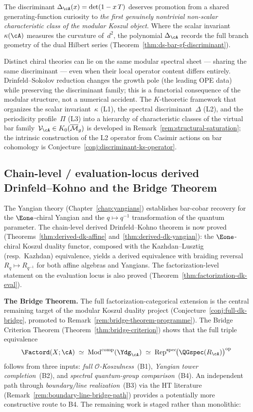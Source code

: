 The discriminant $\Delta_{\cA}(x) = \det(1 - x\,T)$ deserves
promotion from a shared generating-function curiosity to
\emph{the first genuinely nontrivial non-scalar characteristic class
of the modular Koszul object}.  Where the scalar invariant
$\kappa(\cA)$ measures the curvature of~$d^2$, the polynomial
$\Delta_{\cA}$ records the full branch geometry of the dual
Hilbert series (Theorem~\ref{thm:ds-bar-gf-discriminant}).

Distinct chiral theories can lie on the same modular spectral
sheet --- sharing the same discriminant --- even when their local
operator content differs entirely.  Drinfeld--Sokolov reduction
changes the growth pole (the leading OPE data) while preserving
the discriminant family; this is a functorial consequence of the
modular structure, not a numerical accident.
The $K$-theoretic framework that organizes the scalar
invariant~$\kappa$ (L1), the spectral discriminant~$\Delta$ (L2),
and the periodicity profile~$\Pi$ (L3) into a hierarchy of
characteristic classes of the virtual bar
family~$\mathcal{V}_{\cA} \in K_0(\overline{\mathcal{M}}_g)$
is developed in Remark~\ref{rem:structural-saturation}; the
intrinsic construction of the L2 operator from Casimir actions
on bar cohomology is Conjecture~\ref{conj:discriminant-ks-operator}.

\subsection{Chain-level / evaluation-locus derived Drinfeld--Kohno and the Bridge Theorem}

The Yangian theory (Chapter~\ref{chap:yangians}) establishes bar-cobar
recovery for the $\Eone$-chiral Yangian and the $q \mapsto q^{-1}$
transformation of the quantum parameter.  The chain-level derived
Drinfeld--Kohno theorem is now proved
(Theorems~\ref{thm:derived-dk-affine}
and~\ref{thm:derived-dk-yangian}): the $\Eone$-chiral Koszul duality
functor, composed with the Kazhdan--Lusztig (resp.\ Kazhdan)
equivalence, yields a derived equivalence with braiding reversal
$R_q \mapsto R_{q^{-1}}$ for both affine algebras and Yangians.
The factorization-level statement on the evaluation locus is also
proved (Theorem~\ref{thm:factorization-dk-eval}).

\medskip\noindent
\textbf{The Bridge Theorem.}
The full factorization-categorical extension is the central remaining
target of the modular Koszul duality project
(Conjecture~\ref{conj:full-dk-bridge}, promoted to
Remark~\ref{rem:bridge-theorem-programme}).
The Bridge Criterion Theorem
(Theorem~\ref{thm:bridge-criterion}) shows that the
full triple equivalence
\[
\Factord(X;\cA)
\;\simeq\;
\operatorname{Mod}^{\mathrm{comp}}(\Ydg_{\cA})
\;\simeq\;
\operatorname{Rep}^{\mathrm{spec}}\!
  \bigl(\QGspec(R_{\cA})\bigr)^{\mathrm{op}}
\]
follows from three inputs:
\emph{full $\mathcal{O}$-Koszulness}~(B1),
\emph{Yangian tower completion}~(B2), and
\emph{spectral quantum-group comparison}~(B4).
An independent path through \emph{boundary/line realization}~(B3)
via the HT literature
(Remark~\ref{rem:boundary-line-bridge-path})
provides a potentially more constructive route to B4.
The remaining work is staged rather than monolithic:


